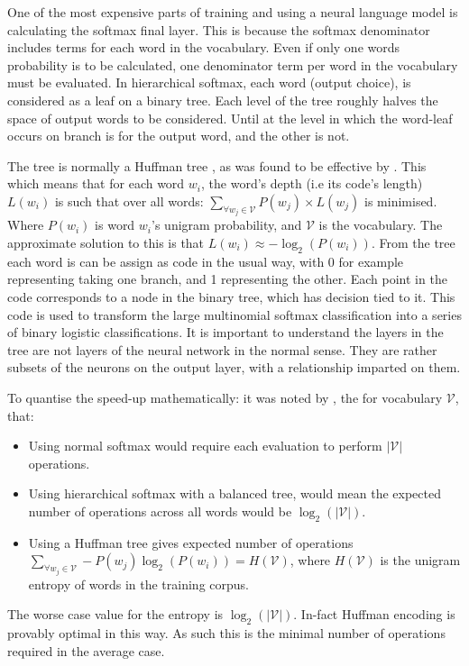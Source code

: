 \documentclass[parskip]{komatufte}
\begin{document}
One of the most expensive parts of training and using a neural language model is calculating the softmax final layer.
This is because the softmax denominator includes terms for each word in the vocabulary.
Even if only one words probability is to be calculated, one denominator term per word in the vocabulary must be evaluated.
In hierarchical softmax, each word (output choice), is considered as a leaf on a binary tree.
Each level of the tree roughly halves the space of output words to be considered.
Until at the level in which the word-leaf occurs on branch is for the output word, and the other is not.

The tree is normally a Huffman tree , as was found to be effective by .
This which means that for each word $w_i$, the word's depth (i.e its code's length) $L(w_i)$ is such that over all words: $\sum_{\forall w_j \in \mathcal{V}} P(w_j)\times L(w_j)$ is minimised.
Where $P(w_i)$ is word $w_i$'s unigram probability, and $\mathcal{V}$ is the vocabulary.
The approximate solution to this is that $L(w_i) \approx -\log_2(P(w_i))$.
From the tree each word is can be assign as code in the usual way, with 0 for example representing taking one branch, and 1 representing the other.
Each point in the code corresponds to a node in the binary tree, which has decision tied to it.
This code is used to transform the large  multinomial softmax classification into a series of binary logistic classifications.
It is important to understand the layers in the tree are not layers of the neural network in the normal sense.
They are rather subsets of the neurons on the output layer, with a relationship imparted on them.

To quantise the speed-up mathematically:
it was noted by , the for vocabulary $\mathcal{V}$, that:
\begin{itemize}
	\item Using normal softmax would require each evaluation to perform $|\mathcal{V}|$ operations.
	\item Using hierarchical softmax with a balanced tree, would mean the expected number of operations across all words would be $\log_2(|\mathcal{V}|)$.
	\item Using a Huffman tree gives expected number of operations $\sum_{\forall w_j \in \mathcal{V}} -P(w_j)\log_2(P(w_i)) = H(\mathcal{V})$, where $H(\mathcal{V})$ is the unigram entropy of words in the training corpus.
\end{itemize}
The worse case value for the entropy is $\log_2(|\mathcal{V}|)$.
In-fact Huffman encoding is provably optimal in this way.
As such this is the minimal number of operations required in the average case.
\end{document}
